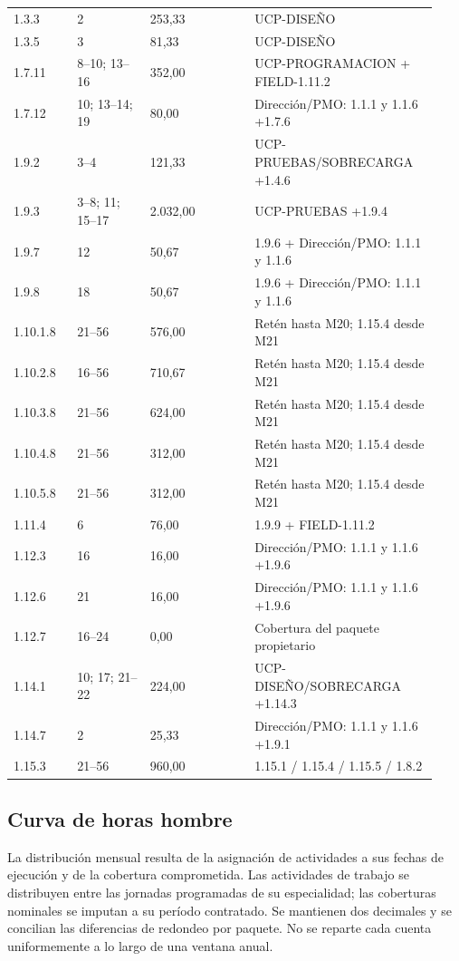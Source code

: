 \documentclass[11pt]{article}
\begin{document}
\begin{longtable}{@{}p{0.14\linewidth}p{0.16\linewidth}p{0.23\linewidth}p{0.4\linewidth}@{}}
1.3.3 & 2 & 253,33 & UCP-DISEÑO \\
1.3.5 & 3 & 81,33 & UCP-DISEÑO \\
1.7.11 & 8--10; 13--16 & 352,00 & UCP-PROGRAMACION + FIELD-1.11.2 \\
1.7.12 & 10; 13--14; 19 & 80,00 & Dirección/PMO: 1.1.1 y 1.1.6 +1.7.6 \\
1.9.2 & 3--4 & 121,33 & UCP-PRUEBAS/SOBRECARGA +1.4.6 \\
1.9.3 & 3--8; 11; 15--17 & 2.032,00 & UCP-PRUEBAS +1.9.4 \\
1.9.7 & 12 & 50,67 & 1.9.6 + Dirección/PMO: 1.1.1 y 1.1.6 \\
1.9.8 & 18 & 50,67 & 1.9.6 + Dirección/PMO: 1.1.1 y 1.1.6 \\
1.10.1.8 & 21--56 & 576,00 & Retén hasta M20; 1.15.4 desde M21 \\
1.10.2.8 & 16--56 & 710,67 & Retén hasta M20; 1.15.4 desde M21 \\
1.10.3.8 & 21--56 & 624,00 & Retén hasta M20; 1.15.4 desde M21 \\
1.10.4.8 & 21--56 & 312,00 & Retén hasta M20; 1.15.4 desde M21 \\
1.10.5.8 & 21--56 & 312,00 & Retén hasta M20; 1.15.4 desde M21 \\
1.11.4 & 6 & 76,00 & 1.9.9 + FIELD-1.11.2 \\
1.12.3 & 16 & 16,00 & Dirección/PMO: 1.1.1 y 1.1.6 +1.9.6 \\
1.12.6 & 21 & 16,00 & Dirección/PMO: 1.1.1 y 1.1.6 +1.9.6 \\
1.12.7 & 16--24 & 0,00 & Cobertura del paquete propietario \\
1.14.1 & 10; 17; 21--22 & 224,00 & UCP-DISEÑO/SOBRECARGA +1.14.3 \\
1.14.7 & 2 & 25,33 & Dirección/PMO: 1.1.1 y 1.1.6 +1.9.1 \\
1.15.3 & 21--56 & 960,00 & 1.15.1 / 1.15.4 / 1.15.5 / 1.8.2 \\
\end{longtable}
\endgroup

\subsection{Curva de horas hombre}

La distribución mensual resulta de la asignación de actividades a sus fechas de ejecución y de la cobertura comprometida. Las actividades de trabajo se distribuyen entre las jornadas programadas de su especialidad; las coberturas nominales se imputan a su período contratado. Se mantienen dos decimales y se concilian las diferencias de redondeo por paquete. No se reparte cada cuenta uniformemente a lo largo de una ventana anual.
\end{document}
